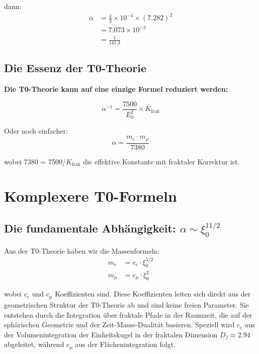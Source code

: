 \documentclass[12pt,a4paper]{article}
\newcommand{\xipar}{\xi_0}
\newcommand{\Kfrak}{K_{\text{frak}}}
\newcommand{\Ezero}{E_0}
\newcommand{\Dfrak}{D_f}
\begin{document}
	dann:
	\begin{align}
		\alpha &= \frac{4}{3} \times 10^{-4} \times (7.282)^2\\
		&= 7.073 \times 10^{-3}\\
		&= \frac{1}{141.3}
	\end{align}
	
	\subsection{Die Essenz der T0-Theorie}
	
	\begin{keyresult}
		\textbf{Die T0-Theorie kann auf eine einzige Formel reduziert werden:}
		
		\begin{equation}
			\boxed{\alpha^{-1} = \frac{7500}{\Ezero^2} \times \Kfrak}
		\end{equation}
		
		Oder noch einfacher:
		\begin{equation}
			\boxed{\alpha = \frac{m_e \cdot m_\mu}{7380}}
		\end{equation}
		
		wobei 7380 = 7500/$\Kfrak$ die effektive Konstante mit fraktaler Korrektur ist.
	\end{keyresult}
	
	\section{Komplexere T0-Formeln}
	
	\subsection{Die fundamentale Abhängigkeit: $\alpha \sim \xipar^{11/2}$}
	
	Aus der T0-Theorie haben wir die Massenformeln:
	\begin{align}
		m_e &= c_e \cdot \xipar^{5/2} \\
		m_\mu &= c_\mu \cdot \xipar^2
	\end{align}
	
	wobei $c_e$ und $c_\mu$ Koeffizienten sind. Diese Koeffizienten leiten sich direkt aus der geometrischen Struktur der T0-Theorie ab und sind keine freien Parameter. Sie entstehen durch die Integration über fraktale Pfade in der Raumzeit, die auf der sphärischen Geometrie und der Zeit-Masse-Dualität basieren. Speziell wird $c_e$ aus der Volumenintegration der Einheitskugel in der fraktalen Dimension $\Dfrak \approx 2.94$ abgeleitet, während $c_\mu$ aus der Flächenintegration folgt.
	
\end{document}

